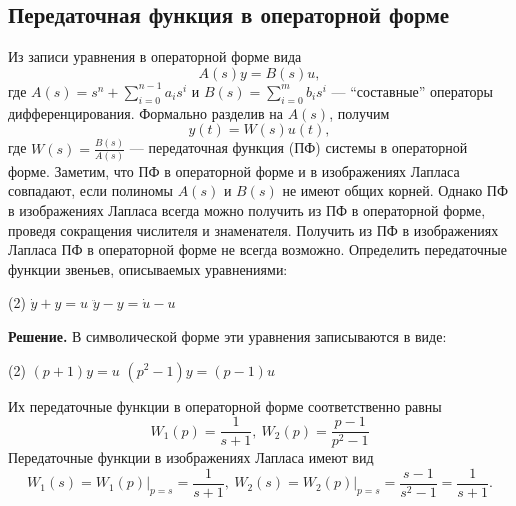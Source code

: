 \documentclass[../../TAU.tex]{subfiles}
\begin{document}
\subsection{Передаточная функция в операторной форме} %
    Из записи уравнения  в операторной форме вида
    \begin{equation}\label{EQ_ODU_SYM_1}
        A(s)y = B(s)u,
    \end{equation}
    где 
    $A(s) = s^n + \sum_{i=0}^{n-1}a_is^i$ и 
    $B(s) = \sum_{i=0}^{m}b_is^i$ --- ``составные'' операторы дифференцирования.
    Формально разделив  на $A(s)$, получим
    \begin{equation}
        y(t) = W(s)u(t),
    \end{equation}
    где 
    $W(s) = \frac{B(s)}{A(s)}$ --- передаточная функция (ПФ) системы  в операторной форме.
    Заметим, что ПФ в операторной форме и в изображениях Лапласа совпадают, если полиномы $A(s)$ и $B(s)$ не имеют общих корней. Однако ПФ в изображениях Лапласа всегда можно получить из ПФ в операторной форме, проведя сокращения числителя и знаменателя. Получить из ПФ в изображениях Лапласа ПФ в операторной форме не всегда возможно.
    \examp Определить передаточные функции звеньев, описываемых уравнениями:
    \begin{tasks}(2)
        \task $\dot y + y = u$
        \task $\ddot y - y = \dot u - u$
    \end{tasks}
    {\bf Решение.}
    В символической форме эти уравнения записываются в виде:
    \begin{tasks}(2)
        \task $(p+1) y = u$
        \task $(p^2-1) y = (p-1) u$
    \end{tasks}
    Их передаточные функции в операторной форме соответственно равны
    $$
        W_1(p)=\frac{1}{s+1}, \ W_2(p)= \frac{p-1}{p^2-1}
    $$
    Передаточные функции в изображениях Лапласа имеют вид
    $$
        \left.W_1(s)=W_1(p)\right\vert_{p=s} = \frac{1}{s+1}, \ 
        \left.W_2(s)=W_2(p)\right\vert_{p=s} = \frac{s-1}{s^2-1} = \frac{1}{s+1}.
    $$
\end{document}
